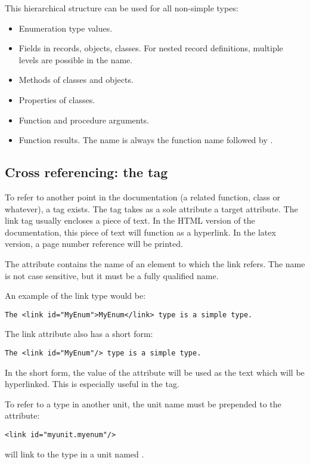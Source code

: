 This hierarchical structure can be used for all non-simple types: 
\begin{itemize}
\item Enumeration type values.
\item Fields in records, objects, classes. For nested record definitions,
multiple levels are possible in the name.
\item Methods of classes and objects.
\item Properties of classes.
\item Function and procedure arguments. 
\item Function results. The name is always the function name followed by
.
\end{itemize}

\subsection{Cross referencing: the  tag}
To refer to another point in the documentation (a related function, class or
whatever), a  tag exists. The  tag takes as a sole
attribute a target  attribute. The link tag usually encloses a
piece of text. In the HTML version of the documentation, this piece of text
will function as a hyperlink. In the latex version, a page number reference
will be printed. 

The  attribute contains the name of an element to which the link
refers. The name is not case sensitive, but it must be a fully qualified
name.

An example of the link type would be:
\begin{verbatim}
The <link id="MyEnum">MyEnum</link> type is a simple type.
\end{verbatim}

The link attribute also has a short form: 
\begin{verbatim}
The <link id="MyEnum"/> type is a simple type.
\end{verbatim}
In the short form, the value of the  attribute will be used as the 
text which will be hyperlinked. This is especially useful in the 
tag.

To refer to a type in another unit, the unit name must be prepended to the
 attribute:
\begin{verbatim}
<link id="myunit.myenum"/>
\end{verbatim}
will link to the  type in a unit named .

